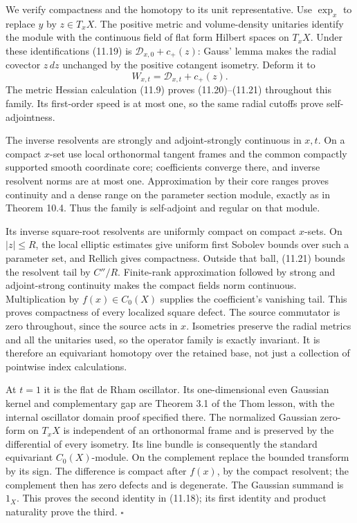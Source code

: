 \documentclass[
  11pt,
]{article}
\begin{document}
We verify compactness and the homotopy to its unit representative. Use
\(\exp_x\) to replace \(y\) by \(z\in T_xX\). The positive metric and
volume-density unitaries identify the module with the continuous field
of flat form Hilbert spaces on \(T_xX\). Under these identifications
(11.19) is \(\mathscr D_{x,0}+c_+(z)\): Gauss' lemma makes the radial
covector \(z\,dz\) unchanged by the positive cotangent isometry. Deform
it to \[
W_{x,t}=\mathscr D_{x,t}+c_+(z).
\tag{11.22}
\] The metric Hessian calculation (11.9) proves (11.20)--(11.21)
throughout this family. Its first-order speed is at most one, so the
same radial cutoffs prove self-adjointness.

The inverse resolvents are strongly and adjoint-strongly continuous in
\(x,t\). On a compact \(x\)-set use local orthonormal tangent frames and
the common compactly supported smooth coordinate core; coefficients
converge there, and inverse resolvent norms are at most one.
Approximation by their core ranges proves continuity and a dense range
on the parameter section module, exactly as in Theorem 10.4. Thus the
family is self-adjoint and regular on that module.

Its inverse square-root resolvents are uniformly compact on compact
\(x\)-sets. On \(|z|\leq R\), the local elliptic estimates give uniform
first Sobolev bounds over such a parameter set, and Rellich gives
compactness. Outside that ball, (11.21) bounds the resolvent tail by
\(C''/R\). Finite-rank approximation followed by strong and
adjoint-strong continuity makes the compact fields norm continuous.
Multiplication by \(f(x)\in C_0(X)\) supplies the coefficient's
vanishing tail. This proves compactness of every localized square
defect. The source commutator is zero throughout, since the source acts
in \(x\). Isometries preserve the radial metrics and all the unitaries
used, so the operator family is exactly invariant. It is therefore an
equivariant homotopy over the retained base, not just a collection of
pointwise index calculations.

At \(t=1\) it is the flat de Rham oscillator. Its one-dimensional even
Gaussian kernel and complementary gap are Theorem 3.1 of the Thom
lesson, with the internal oscillator domain proof specified there. The
normalized Gaussian zero-form on \(T_xX\) is independent of an
orthonormal frame and is preserved by the differential of every
isometry. Its line bundle is consequently the standard equivariant
\(C_0(X)\)-module. On the complement replace the bounded transform by
its sign. The difference is compact after \(f(x)\), by the compact
resolvent; the complement then has zero defects and is degenerate. The
Gaussian summand is \(1_X\). This proves the second identity in (11.18);
its first identity and product naturality prove the third. \(\square\)
\end{document}

